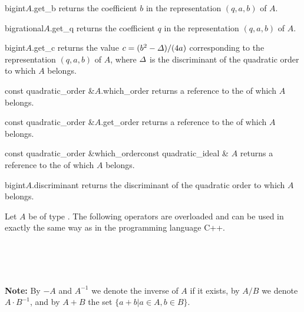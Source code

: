 \begin{cfcode}{bigint}{$A$.get_b}{}
  returns the coefficient $b$ in the representation $(q,a,b)$ of $A$.
\end{cfcode}

\begin{cfcode}{bigrational}{$A$.get_q}{}
  returns the coefficient $q$ in the representation $(q,a,b)$ of $A$.
\end{cfcode}

\begin{cfcode}{bigint}{$A$.get_c}{}
  returns the value $c = (b^2 - \varDelta ) / (4a)$ corresponding to the representation $(q,a,b)$ of
  $A$, where $\varDelta$ is the discriminant of the quadratic order to which $A$ belongs.
\end{cfcode}

\begin{cfcode}{const quadratic_order &}{$A$.which_order}{}
  returns a reference to the  of which $A$ belongs.
\end{cfcode}

\begin{cfcode}{const quadratic_order &}{$A$.get_order}{}
  returns a reference to the  of which $A$ belongs.
\end{cfcode}

\begin{fcode}{const quadratic_order &}{which_order}{const quadratic_ideal & $A$}
  returns a reference to the  of which $A$ belongs.
\end{fcode}

\begin{cfcode}{bigint}{$A$.discriminant}{}
  returns the discriminant of the quadratic order to which $A$ belongs.
\end{cfcode}



\ARTH

Let $A$ be of type .  The following operators are overloaded and can be
used in exactly the same way as in the programming language C++.
\begin{center}
  \\
  \\
  \\
\end{center}
\textbf{Note:} By $-A$ and $A^{-1}$ we denote the inverse of $A$ if it exists, by $A / B$ we
denote $A \cdot B^{-1}$, and by $A + B$ the set $\{ a+b | a\in A, b\in B\}$.

